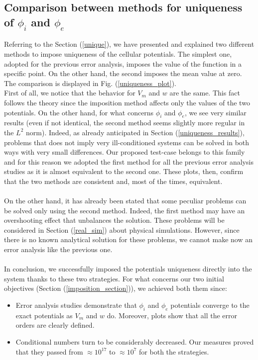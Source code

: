 \documentclass[a4paper,11pt]{article}
\begin{document}
\subsection{Comparison between methods for uniqueness of $\phi_i$ and $\phi_e$}
Referring to the Section (\ref{unique}), we have presented and explained two different methods to impose uniqueness of the cellular potentials.
The simplest one, adopted for the previous error analysis, imposes the value of the function in a specific point. On the other hand, the second imposes the mean value at zero. The comparison is displayed in Fig. (\ref{uniqueness_plot}). \\
\noindent First of all, we notice that the behavior for $V_m$ and $w$ are the same. This fact follows the theory since the imposition method affects only the values of the two potentials. On the other hand, for what concerns $\phi_i$ and $\phi_e$, we see very similar results (even if not identical, the second method seems slightly more regular in the $L^2$ norm). Indeed, as already anticipated in Section (\ref{uniqueness_results}), problems that does not imply very ill-conditioned systems can be solved in both ways with very small differences. Our proposed test-case belongs to this family and for this reason we adopted the first method for all the previous error analysis studies as it is almost equivalent to the second one. These plots, then, confirm that the two methods are consistent and, most of the times, equivalent. \\ \\
On the other hand, it has already been stated that some peculiar problems can be solved only using the second method. Indeed, the first method may have an overshooting effect that unbalances the solution. These problems will be considered in Section (\ref{real_sim}) about physical simulations. However, since there is no known analytical solution for these problems, we cannot make now an error analysis like the previous one.\\ \\
\noindent In conclusion, we successfully imposed the potentials uniqueness directly into the system thanks to these two strategies. For what concerns our two initial objectives (Section (\ref{imposition_section})), we achieved both them since:
\begin{itemize}
	\item Error analysis studies demonstrate that $\phi_i$ and $\phi_e$ potentials converge to the exact potentials as $V_m$ and $w$ do. Moreover, plots show that all the error orders are clearly defined.
	\item Conditional numbers turn to be considerably decreased. Our measures proved that they passed from $\approx 10^{17}$ to $\approx 10^{7}$ for both the strategies.
\end{itemize}
\end{document}
